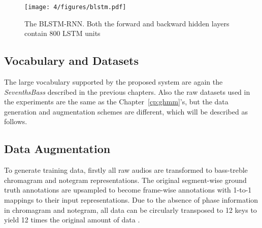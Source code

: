 \begin{figure}[htb]
	\centering
	\texttt{[image: 4/figures/blstm.pdf]}
	\caption{The BLSTM-RNN. Both the forward and backward hidden layers contain 800 LSTM units}
	\label{fig:4-blstm}
\end{figure}

\subsection{Vocabulary and Datasets}
The large vocabulary supported by the proposed system are again the \textit{SeventhsBass} described in the previous chapters. Also the raw datasets used in the experiments are the same as the Chapter~\ref{cp:ghmm}'s, but the data generation and augmentation schemes are different, which will be described as follows.

\subsection{Data Augmentation}
To generate training data, firstly all raw audios are transformed to bass-treble chromagram and notegram representations. The original segment-wise ground truth annotations are upsampled to become frame-wise annotations with 1-to-1 mappings to their input representations. Due to the absence of phase information in chromagram and notegram, all data can be circularly transposed to 12 keys to yield 12 times the original amount of data \cite{humphrey2012rethinking}.

